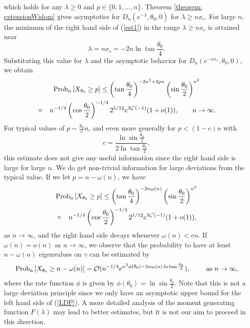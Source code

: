 \documentclass[11pt,fleqn]{article}
\numberwithin{equation}{section}
\def\bigO{{\cal O}}
\begin{document}
which holds for any $\lambda\geq 0$ and $p\in\{0,1,\ldots, n\}$. Theorem \ref{theorem: extensionWidom} gives asymptotics for $D_n(e^{-\lambda},\theta_0,0)$ for $\lambda\geq nx_c$. For large $n$, the minimum of the right hand side of (\ref{est1}) in the range $\lambda\geq nx_c$ is attained near
\begin{equation}\lambda=nx_c=-2n\ln\tan\frac{\theta_0}{4}.
\end{equation}
Substituting this value for $\lambda$ and the asymptotic behavior for $D_n(e^{-nx_c},\theta_0,0)$, we obtain
\begin{multline}
{\rm Prob}_n\left[X_{\theta_0}\geq p\right]\leq 
\left(\tan\frac{\theta_0}{4}\right)^{-2n^2+2pn}
\left(\sin\frac{\theta_0}{2}\right)^{n^2}
\\
\times\quad n^{-1/4}\left( \cos \frac{\theta_{0}}{2} \right)^{-1/4} 2^{1/12}e^{3\zeta'(-1)}(1+o(1)),\qquad n\to\infty.
\end{multline}
For typical values of $p\sim \frac{\theta_0}{\pi}n$, and even more generally for $p < (1-c)n$ with 
\begin{equation}
c=\frac{\ln\sin\frac{\theta_0}{2}}{2\ln\tan\frac{\theta_0}{4}},
\end{equation} this estimate does not give any useful information since the right hand side is large for large $n$.
We do get non-trivial information for large deviations from the typical value. If we let $p=n-\omega(n)$, we have
\begin{multline}
{\rm Prob_n}\left[X_{\theta_0}\geq p\right]\leq 
\left(\tan\frac{\theta_0}{4}\right)^{-2n\omega(n)}
\left(\sin\frac{\theta_0}{2}\right)^{n^2}
\\
\times \quad n^{-1/4}\left( \cos \frac{\theta_{0}}{2} \right)^{-1/4}2^{1/12}e^{3\zeta'(-1)}(1+o(1)),
\end{multline}
as $n\to\infty$,
and the right hand side decays whenever $\omega(n)<cn$.
If $\omega(n)=o(n)$ as $n\to\infty$, we observe that the probability to have at least $n-\omega(n)$ eigenvalues on $\gamma$ can be estimated by
\begin{equation}
{\rm Prob_n}\left[X_{\theta_0}\geq n-\omega(n)\right]=\bigO(n^{-1/4}e^{n^2\phi(\theta_0)-2n\omega(n)\ln\tan\frac{\theta_0}{4}}), \qquad \mbox{ as $n\to\infty$,}\label{LDP}
\end{equation}
where the rate function $\phi$ is given by $\phi(\theta_0)=\ln\sin\frac{\theta_0}{2}$.
Note that this is not a large deviation principle since we only have an asymptotic upper bound for the left hand side of (\ref{LDP}). A more detailed analysis of the moment generating function $F(\lambda)$ may lead to better estimates, but it is not our aim to proceed in this direction.  
\end{document}

